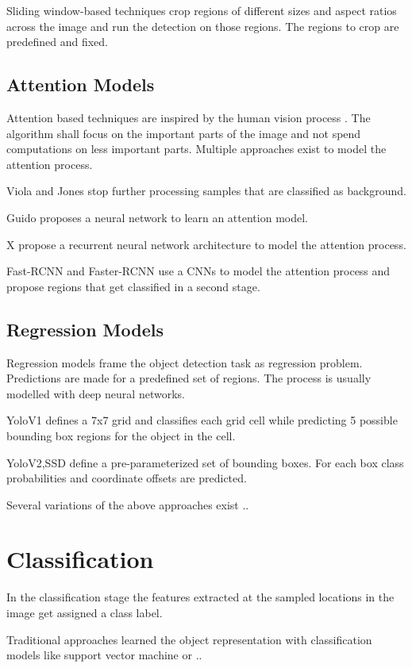 	Sliding window-based techniques crop regions of different sizes and aspect ratios across the image and run the detection on those regions. The regions to crop are predefined and fixed. 
	
	\subsection{Attention Models}
	
	Attention based techniques are inspired by the human vision process . The algorithm shall focus on the important parts of the image and not spend computations on less important parts. Multiple approaches exist to model the attention process.
	
	Viola and Jones stop further processing samples that are classified as background.
	
	Guido proposes a neural network to learn an attention model.
	
	X propose a recurrent neural network architecture to model the attention process.
	
	Fast-RCNN and Faster-RCNN use a \acp{CNN} to model the attention process and propose regions that get classified in a second stage.
	
	\subsection{Regression Models}
	
	Regression models frame the object detection task as regression problem. Predictions are made for a predefined set of regions. The process is usually modelled with deep neural networks.
	
	YoloV1 defines a 7x7 grid and classifies each grid cell while predicting 5 possible bounding box regions for the object in the cell.
	
	YoloV2,SSD define a pre-parameterized set of bounding boxes. For each box class probabilities and coordinate offsets are predicted. 
	
	Several variations of the above approaches exist ..
	
	\section{Classification}
	
	In the classification stage the features extracted at the sampled locations in the image get assigned a class label.
	
	Traditional approaches learned the object representation with classification models like support vector machine or ..
	
